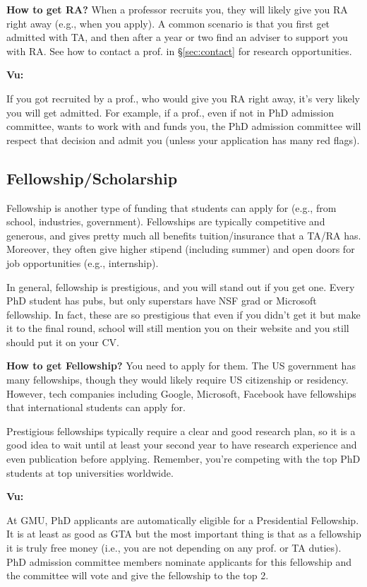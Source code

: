 \documentclass[11pt]{article}
\newenvironment{commentbox}[1][]{
\small
    \begin{mybox}
    {\small \textbf{#1}}
 }{
   \end{mybox}
}
\begin{document}
\textbf{How to get RA?} When a professor recruits you, they will likely give you RA right away (e.g., when you apply).  A common scenario is that you first get admitted with TA, and then after a year or two find an adviser to support you with RA. See how to contact a prof. in \S\ref{sec:contact} for research opportunities.


\begin{commentbox}[Vu:]
If you got recruited by a prof., who would give you RA right away, it's very likely you will get admitted.  For example, if a prof., even if not in PhD admission committee, wants to work with and funds you, the PhD admission committee will respect that decision and admit you (unless your application has many red flags).
\end{commentbox}

\subsection{Fellowship/Scholarship}

Fellowship is another type of funding that students can apply for (e.g., from school, industries, government). Fellowships are typically competitive and generous, and gives pretty much all benefits tuition/insurance that a TA/RA has.  Moreover, they often give higher stipend (including summer) and open doors for job opportunities (e.g., internship).

In general, fellowship is prestigious, and you will stand out if you get one.  Every PhD student has pubs, but only superstars have NSF grad or Microsoft fellowship. In fact, these are so prestigious that even if you didn't get it but make it to the final round, school will still mention you on their website and you still should put it on your CV.


\textbf{How to get Fellowship?} You need to apply for them.  The US government has many fellowships, though they would likely require US citizenship or residency.  However, tech companies including Google, Microsoft, Facebook have fellowships that international students can apply for. 

Prestigious fellowships typically require a clear and good research plan, so it is a good idea to wait until at least your second year to have research experience and even publication before applying. Remember, you're competing with the top PhD students at top universities worldwide. 


\begin{commentbox}[Vu:]
At GMU, PhD applicants are automatically eligible for a Presidential Fellowship.  It is at least as good as GTA but the most important thing is that as a fellowship it is truly free money (i.e., you are not depending on any prof. or TA duties).  PhD admission committee members nominate applicants for this fellowship and the committee will vote and give the fellowship to the top 2.
\end{commentbox}
\end{document}
